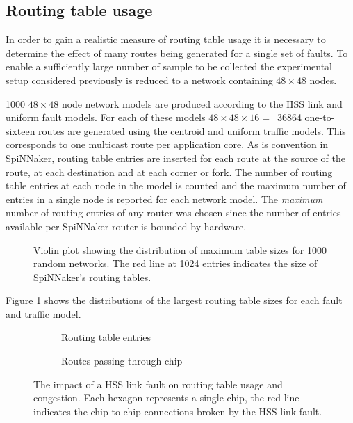 		\subsection{Routing table usage}
			
			In order to gain a realistic measure of routing table usage it is
			necessary to determine the effect of many routes being generated for a
			single set of faults. To enable a sufficiently large number of sample to
			be collected the experimental setup considered previously is reduced to a
			network containing $48\times48$ nodes.
			
			\num{1000} $48\times48$ node network models are produced according to the
			HSS link and uniform fault models. For each of these models
			$48\times48\times16=$~\num{36864} one-to-sixteen routes are generated using
			the centroid and uniform traffic models. This corresponds to one
			multicast route per application core. As is convention in SpiNNaker,
			routing table entries are inserted for each route at the source of the
			route, at each destination and at each corner or fork. The number of
			routing table entries at each node in the model is counted and the
			maximum number of entries in a single node is reported for each network
			model.  The \emph{maximum} number of routing entries of any router was
			chosen since the number of entries available per SpiNNaker router is
			bounded by hardware.
			
			\begin{figure}
				\center
				
				\caption{Violin plot showing the distribution of maximum table sizes
				for \num{1000} random networks. The red line at \num{1024} entries
				indicates the size of SpiNNaker's routing tables.}
				\label{fig:routing-entries}
			\end{figure}
			
			
			Figure \ref{fig:routing-entries} shows the distributions of the largest
			routing table sizes for each fault and traffic model.
			
			\begin{figure}
				\center
				\begin{subfigure}{0.48\linewidth}
					\center
					
					\caption{Routing table entries}
					\label{fig:hss-link-routing-table-usage}
				\end{subfigure}
				\begin{subfigure}{0.48\linewidth}
					\center
					
					\caption{Routes passing through chip}
					\label{fig:hss-link-resource-usage}
				\end{subfigure}
				
				\caption{The impact of a HSS link fault on routing table usage and
				congestion. Each hexagon represents a single chip, the red line
				indicates the chip-to-chip connections broken by the HSS link fault.}
				\label{fig:hss-link-usage}
			\end{figure}
			
